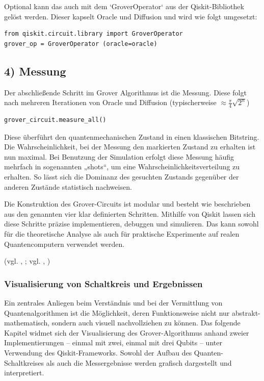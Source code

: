 Optional kann das auch mit dem `GroverOperator` aus der Qiskit-Bibliothek gelöst werden. Dieser kapselt Oracle und Diffusion und wird wie folgt umgesetzt:
\begin{verbatim}
from qiskit.circuit.library import GroverOperator
grover_op = GroverOperator (oracle=oracle)
\end{verbatim}

\subsection*{4) Messung}
Der abschließende Schritt im Grover Algorithmus ist die Messung. Diese folgt nach mehreren Iterationen von Oracle und Diffusion (typischerweise $\approx \frac{\pi}{4} \sqrt{2^n}$)
\begin{verbatim}
grover_circuit.measure_all()
\end{verbatim}
Diese überführt den quantenmechanischen Zustand in einen klassischen Bitstring. 
Die Wahrscheinlichkeit, bei der Messung den markierten Zustand zu erhalten ist nun maximal. Bei Benutzung der Simulation erfolgt diese Messung häufig mehrfach in sogenannten „shots“, um eine Wahrscheinlichkeitsverteilung zu erhalten. So lässt sich die Dominanz des gesuchten Zustands gegenüber der anderen Zustände statistisch nachweisen.

Die Konstruktion des Grover-Circuits ist modular und besteht wie beschrieben aus den genannten vier klar definierten Schritten. Mithilfe von Qiskit lassen sich diese Schritte präzise implementieren, debuggen und simulieren. Das kann sowohl für die theoretische Analyse als auch für praktische Experimente auf realen Quantencomputern verwendet werden.

(vgl. \citeauthor{ibm_quantum_nodate}, \citeyear{ibm_quantum_nodate}; vgl. \citeauthor{noauthor_grovers_nodate}, \citeyear{noauthor_grovers_nodate})

\subsubsection{Visualisierung von Schaltkreis und Ergebnissen}

\setlength{\parindent}{0pt} %
\setlength{\parskip}{1em}   %

Ein zentrales Anliegen beim Verständnis und bei der Vermittlung von Quantenalgorithmen ist die Möglichkeit, deren Funktionsweise nicht nur abstrakt-mathematisch, sondern auch visuell nachvollziehen zu können. Das folgende Kapitel widmet sich der Visualisierung des Grover-Algorithmus anhand zweier Implementierungen – einmal mit zwei, einmal mit drei Qubits – unter Verwendung des Qiskit-Frameworks. Sowohl der Aufbau des Quanten-Schaltkreises als auch die Messergebnisse werden grafisch dargestellt und interpretiert.

